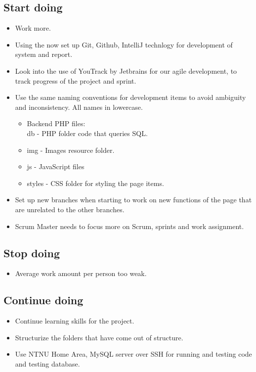\subsection{Start doing}
\begin{itemize}
\item Work more. 
\item Using the now set up Git, Github, IntelliJ technlogy for development of system and report. 
\item Look into the use of YouTrack by Jetbrains for our agile development, to track progress of the project and sprint. 
\item Use the same naming conventions for development items to avoid ambiguity and inconsistency. All names in lowercase. 
\begin{itemize}
\item Backend PHP files: \\ db - PHP folder code that queries SQL. 
\item img - Images resource folder. 
\item js - JavaScript files
\item styles - CSS folder for styling the page items. 
\end{itemize}
\item Set up new branches when starting to work on new functions of the page that are unrelated to the other branches. 
\item Scrum Master needs to focus more on Scrum, sprints and work assignment. \\
\end{itemize}

\subsection{Stop doing}
\begin{itemize}
\item Average work amount per person too weak.  \\
\end{itemize}

\subsection{Continue doing}
\begin{itemize}
\item Continue learning skills for the project.
\item Structurize the folders that have come out of structure. 
\item Use NTNU Home Area, MySQL server over SSH for running and testing code and testing database. \\
\end{itemize}


